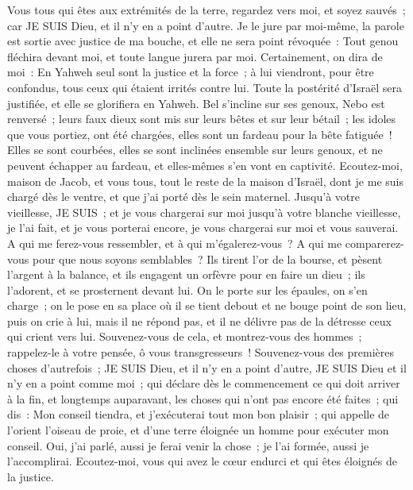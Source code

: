 \begin{multicols}{2}
Vous tous qui êtes aux extrémités de la terre, regardez vers moi, et soyez sauvés~; car JE SUIS Dieu, et il n'y en a point d'autre.
Je le jure par moi-même, la parole est sortie avec justice de ma bouche, et elle ne sera point révoquée~: Tout genou fléchira devant moi, et toute langue jurera par moi.
Certainement, on dira de moi~: En Yahweh seul sont la justice et la force~; à lui viendront, pour être confondus, tous ceux qui étaient irrités contre lui.
Toute la postérité d'Israël sera justifiée, et elle se glorifiera en Yahweh.
\VerseOne{}Bel s'incline sur ses genoux, Nebo est renversé~; leurs faux dieux sont mis sur leurs bêtes et sur leur bétail~; les idoles que vous portiez, ont été chargées, elles sont un fardeau pour la bête fatiguée~!
Elles se sont courbées, elles se sont inclinées ensemble sur leurs genoux, et ne peuvent échapper au fardeau, et elles-mêmes s'en vont en captivité.
Ecoutez-moi, maison de Jacob, et vous tous, tout le reste de la maison d'Israël, dont je me suis chargé dès le ventre, et que j'ai porté dès le sein maternel.
Jusqu'à votre vieillesse, JE SUIS~; et je vous chargerai sur moi jusqu'à votre blanche vieillesse, je l'ai fait, et je vous porterai encore, je vous chargerai sur moi et vous sauverai.
A qui me ferez-vous ressembler, et à qui m'égalerez-vous~? A qui me comparerez-vous pour que nous soyons semblables~?
Ils tirent l'or de la bourse, et pèsent l'argent à la balance, et ils engagent un orfèvre pour en faire un dieu~; ils l'adorent, et se prosternent devant lui.
On le porte sur les épaules, on s'en charge~; on le pose en sa place où il se tient debout et ne bouge point de son lieu, puis on crie à lui, mais il ne répond pas, et il ne délivre pas de la détresse ceux qui crient vers lui.
Souvenez-vous de cela, et montrez-vous des hommes~; rappelez-le à votre pensée, ô vous transgresseurs~!
Souvenez-vous des premières choses d'autrefois~; JE SUIS Dieu, et il n'y en a point d'autre, JE SUIS Dieu et il n'y en a point comme moi~;
qui déclare dès le commencement ce qui doit arriver à la fin, et longtemps auparavant, les choses qui n'ont pas encore été faites~; qui dis~: Mon conseil tiendra, et j'exécuterai tout mon bon plaisir~;
qui appelle de l'orient l'oiseau de proie, et d'une terre éloignée un homme pour exécuter mon conseil. Oui, j'ai parlé, aussi je ferai venir la chose~; je l'ai formée, aussi je l'accomplirai.
Ecoutez-moi, vous qui avez le cœur endurci et qui êtes éloignés de la justice.

\end{multicols}
